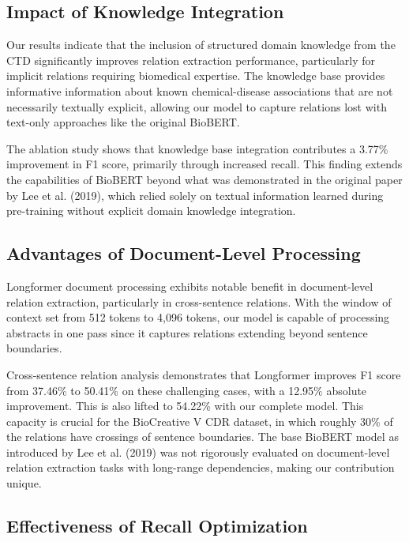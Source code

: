 \documentclass{amia}
\begin{document}
\subsection*{Impact of Knowledge Integration}

Our results indicate that the inclusion of structured domain knowledge from the CTD significantly improves relation extraction performance, particularly for implicit relations requiring biomedical expertise. The knowledge base provides informative information about known chemical-disease associations that are not necessarily textually explicit, allowing our model to capture relations lost with text-only approaches like the original BioBERT.

The ablation study shows that knowledge base integration contributes a 3.77\% improvement in F1 score, primarily through increased recall. This finding extends the capabilities of BioBERT beyond what was demonstrated in the original paper by Lee et al. (2019), which relied solely on textual information learned during pre-training without explicit domain knowledge integration.

\subsection*{Advantages of Document-Level Processing}

Longformer document processing exhibits notable benefit in document-level relation extraction, particularly in cross-sentence relations. With the window of context set from 512 tokens to 4,096 tokens, our model is capable of processing abstracts in one pass since it captures relations extending beyond sentence boundaries.

Cross-sentence relation analysis demonstrates that Longformer improves F1 score from 37.46\% to 50.41\% on these challenging cases, with a 12.95\% absolute improvement. This is also lifted to 54.22\% with our complete model. This capacity is crucial for the BioCreative V CDR dataset, in which roughly 30\% of the relations have crossings of sentence boundaries. The base BioBERT model as introduced by Lee et al. (2019) was not rigorously evaluated on document-level relation extraction tasks with long-range dependencies, making our contribution unique.

\subsection*{Effectiveness of Recall Optimization}
\end{document}
